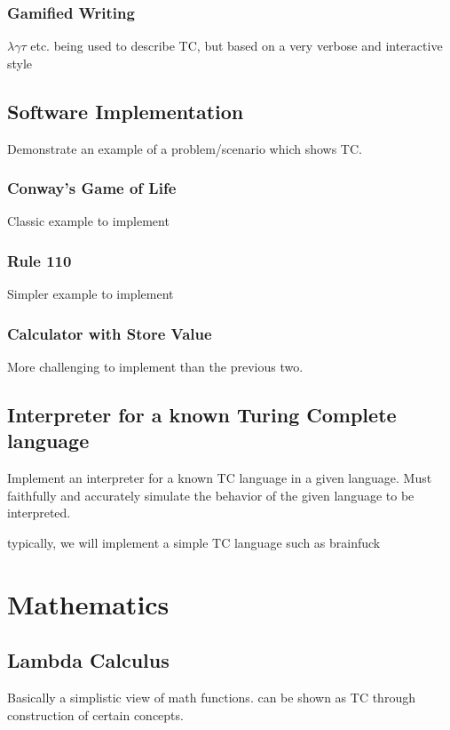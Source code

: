 \subsubsection{Gamified Writing}\label{subsubsec:GamifiedWriting}

$\lambda \gamma \tau $ etc. being used to describe TC, but based on a very verbose and interactive style

\subsection{Software Implementation}\label{subsec:SoftwareImplementation}

Demonstrate an example of a problem/scenario which shows TC.

\subsubsection{Conway's Game of Life}\label{subsubsec:CGoL}

Classic example to implement

\subsubsection{Rule 110}\label{subsubsec:Rule110}

Simpler example to implement

\subsubsection{Calculator with Store Value}\label{subsubsec:CalculatorStore}

More challenging to implement than the previous two.

\subsection{Interpreter for a known Turing Complete language}\label{subsec:InterpreterTC}

Implement an interpreter for a known TC language in a given language.
Must faithfully and accurately simulate the behavior of the given language to be interpreted.

typically, we will implement a simple TC language such as brainfuck

\section{Mathematics}\label{sec:Maths}

\subsection{Lambda Calculus}\label{subsec:LambdaCalc}

Basically a simplistic view of math functions.
can be shown as TC through construction of certain concepts.